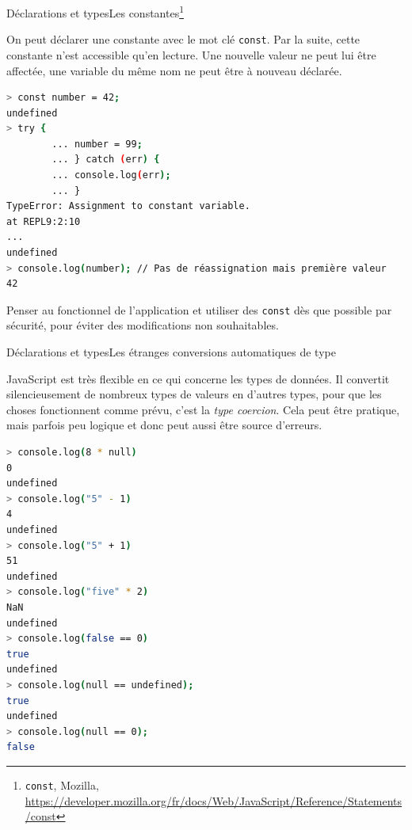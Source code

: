 \documentclass{beamer}
\begin{document}
    \begin{frame}[fragile]{Déclarations et types}{Les constantes\footnote{\lstinline{const}, Mozilla, \url{https://developer.mozilla.org/fr/docs/Web/JavaScript/Reference/Statements/const}}}
        \begin{footnotesize}
            On peut déclarer une constante avec le mot clé \lstinline{const}.
            Par la suite, cette constante n'est accessible qu'en lecture.
            Une nouvelle valeur ne peut lui être affectée, une variable du même nom ne peut être à nouveau déclarée.
            \begin{lstlisting}[language=Bash,title={\tiny{Node.js}},basicstyle=\tiny\ttfamily]
> const number = 42;
undefined
> try {
        ... number = 99;
        ... } catch (err) {
        ... console.log(err);
        ... }
TypeError: Assignment to constant variable.
at REPL9:2:10
...
undefined
> console.log(number); // Pas de réassignation mais première valeur
42
            \end{lstlisting}
            \begin{dangercolorbox}
                Penser au fonctionnel de l'application et utiliser des \lstinline{const} dès que possible par sécurité, pour éviter des modifications non souhaitables.
            \end{dangercolorbox}
        \end{footnotesize}
    \end{frame}

    \begin{frame}[fragile]{Déclarations et types}{Les étranges conversions automatiques de type}
        \begin{footnotesize}
            JavaScript est très flexible en ce qui concerne les types de données.
            Il convertit silencieusement de nombreux types de valeurs en d'autres types, pour que les choses fonctionnent comme prévu, c'est la \textit{type coercion}.
            Cela peut être pratique, mais parfois peu logique et donc peut aussi être source d'erreurs.
        \end{footnotesize}
        \begin{lstlisting}[language=Bash,title={\tiny{Node.js}},basicstyle=\tiny\ttfamily]
> console.log(8 * null)
0
undefined
> console.log("5" - 1)
4
undefined
> console.log("5" + 1)
51
undefined
> console.log("five" * 2)
NaN
undefined
> console.log(false == 0)
true
undefined
> console.log(null == undefined);
true
undefined
> console.log(null == 0);
false
        \end{lstlisting}
    \end{frame}
\end{document}
